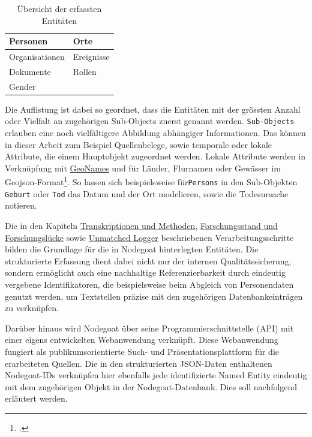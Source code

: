 \documentclass[12pt, a4paper, ngerman, bidi=default]{article}
\let\cite\footcite
\newcommand{\code}[1]{\colorbox{VeryLightGray}{\texttt{#1}}} %
\begin{document}
\begin{table}[h]
  \renewcommand{\arraystretch}{1.5}
  \centering
  \begin{tabular}{|p{}|p{}|}
    \hline
    Personen & Orte \\ \hline
    Organisationen & Ereignisse \\ \hline
    Dokumente & Rollen \\ \hline
    Gender & \\ \hline
  \end{tabular}
  \caption{\small Übersicht der erfassten Entitäten}
\end{table}

Die Auflistung ist dabei so geordnet, dass die Entitäten mit der grössten Anzahl oder Vielfalt an zugehörigen Sub-Objects zuerst genannt werden. \code{Sub-Objects} erlauben eine
noch vielfältigere Abbildung abhängiger Informationen. Das können in dieser Arbeit zum Beispiel Quellenbelege, sowie temporale oder lokale Attribute, die einem Hauptobjekt zugeordnet werden. Lokale Attribute 
werden in Verknüpfung mit \hyperref[subsec:geonames]{GeoNames} und für Länder, Flurnamen oder Gewässer im Geojson-Format\cite[Weiterführend:][]{thomson_geographic_2017}. So lassen sich beispielsweise für\code{Persons}
in den Sub-Objekten \code{Geburt} oder \code{Tod} das Datum und der Ort modelieren, sowie die Todesursache notieren.

Die in den Kapiteln \hyperref[section:Transkriptionen_Methoden]{Transkriptionen und Methoden}, \hyperref[subsec:forschungsstand]{Forschungsstand und Forschungslücke} 
sowie \hyperref[subsec:unmatched_logger]{Unmatched Logger} beschriebenen Verarbeitungsschritte bilden die Grundlage für die in Nodegoat hinterlegten Entitäten.
Die strukturierte Erfassung dient dabei nicht nur der internen Qualitätssicherung, sondern ermöglicht auch eine nachhaltige Referenzierbarkeit durch eindeutig 
vergebene Identifikatoren, die beispielsweise beim Abgleich von Personendaten genutzt werden, um Textstellen präzise mit den zugehörigen Datenbankeinträgen zu verknüpfen.

Darüber hinaus wird Nodegoat über seine Programmierschnittstelle (API) mit einer eigens entwickelten Webanwendung verknüpft. Diese Webanwendung fungiert als publikumsorientierte 
Such- und Präsentationsplattform für die erarbeiteten Quellen. Die in den strukturierten JSON-Daten enthaltenen Nodegoat-IDs verknüpfen hier ebenfalls jede identifizierte Named Entity eindeutig mit dem 
zugehörigen Objekt in der Nodegoat-Datenbank. Dies soll nachfolgend erläutert werden.
\end{document}
